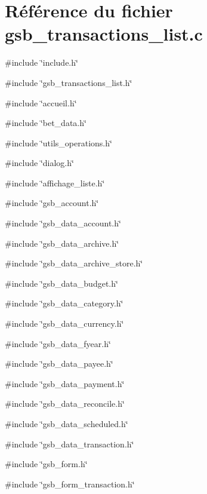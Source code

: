 \section{Référence du fichier gsb\_\-transactions\_\-list.c}
\label{gsb__transactions__list_8c}
{\ttfamily \#include \char`\"{}include.h\char`\"{}}\par
{\ttfamily \#include \char`\"{}gsb\_\-transactions\_\-list.h\char`\"{}}\par
{\ttfamily \#include \char`\"{}accueil.h\char`\"{}}\par
{\ttfamily \#include \char`\"{}bet\_\-data.h\char`\"{}}\par
{\ttfamily \#include \char`\"{}utils\_\-operations.h\char`\"{}}\par
{\ttfamily \#include \char`\"{}dialog.h\char`\"{}}\par
{\ttfamily \#include \char`\"{}affichage\_\-liste.h\char`\"{}}\par
{\ttfamily \#include \char`\"{}gsb\_\-account.h\char`\"{}}\par
{\ttfamily \#include \char`\"{}gsb\_\-data\_\-account.h\char`\"{}}\par
{\ttfamily \#include \char`\"{}gsb\_\-data\_\-archive.h\char`\"{}}\par
{\ttfamily \#include \char`\"{}gsb\_\-data\_\-archive\_\-store.h\char`\"{}}\par
{\ttfamily \#include \char`\"{}gsb\_\-data\_\-budget.h\char`\"{}}\par
{\ttfamily \#include \char`\"{}gsb\_\-data\_\-category.h\char`\"{}}\par
{\ttfamily \#include \char`\"{}gsb\_\-data\_\-currency.h\char`\"{}}\par
{\ttfamily \#include \char`\"{}gsb\_\-data\_\-fyear.h\char`\"{}}\par
{\ttfamily \#include \char`\"{}gsb\_\-data\_\-payee.h\char`\"{}}\par
{\ttfamily \#include \char`\"{}gsb\_\-data\_\-payment.h\char`\"{}}\par
{\ttfamily \#include \char`\"{}gsb\_\-data\_\-reconcile.h\char`\"{}}\par
{\ttfamily \#include \char`\"{}gsb\_\-data\_\-scheduled.h\char`\"{}}\par
{\ttfamily \#include \char`\"{}gsb\_\-data\_\-transaction.h\char`\"{}}\par
{\ttfamily \#include \char`\"{}gsb\_\-form.h\char`\"{}}\par
{\ttfamily \#include \char`\"{}gsb\_\-form\_\-transaction.h\char`\"{}}\par
